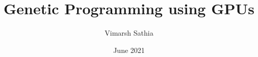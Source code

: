 \documentclass[BTech]{iitmdiss}
\begin{document}


\title{Genetic Programming using GPUs}
\author{Vimarsh Sathia}
\date{June 2021}

\begin{singlespace}
\maketitle
\end{singlespace}







\begin{singlespace}
\tableofcontents
\thispagestyle{empty}

\listoftables
{}
\listoffigures
{}
\end{singlespace}


% 








% 
% 

\end{document}
